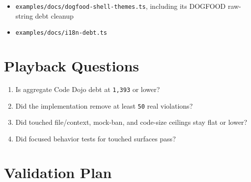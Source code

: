 \begin{itemize}
\item
  \texttt{e\allowbreak{}x\allowbreak{}a\allowbreak{}m\allowbreak{}p\allowbreak{}l\allowbreak{}e\allowbreak{}s\allowbreak{}/\allowbreak{}d\allowbreak{}o\allowbreak{}c\allowbreak{}s\allowbreak{}/\allowbreak{}d\allowbreak{}o\allowbreak{}g\allowbreak{}f\allowbreak{}o\allowbreak{}o\allowbreak{}d\allowbreak{}-\allowbreak{}s\allowbreak{}h\allowbreak{}e\allowbreak{}l\allowbreak{}l\allowbreak{}-\allowbreak{}t\allowbreak{}h\allowbreak{}e\allowbreak{}m\allowbreak{}e\allowbreak{}s\allowbreak{}.\allowbreak{}t\allowbreak{}s}, including its DOGFOOD raw-string debt cleanup
\item
  \texttt{e\allowbreak{}x\allowbreak{}a\allowbreak{}m\allowbreak{}p\allowbreak{}l\allowbreak{}e\allowbreak{}s\allowbreak{}/\allowbreak{}d\allowbreak{}o\allowbreak{}c\allowbreak{}s\allowbreak{}/\allowbreak{}i\allowbreak{}1\allowbreak{}8\allowbreak{}n\allowbreak{}-\allowbreak{}d\allowbreak{}e\allowbreak{}b\allowbreak{}t\allowbreak{}.\allowbreak{}t\allowbreak{}s}
\end{itemize}

\section{Playback Questions}\label{record-228-playback-questions}

\begin{enumerate}
\def\labelenumi{\arabic{enumi}.}
\tightlist
\item
  Is aggregate Code Dojo debt at \texttt{1\allowbreak{},\allowbreak{}3\allowbreak{}9\allowbreak{}3} or lower?
\item
  Did the implementation remove at least \texttt{5\allowbreak{}0} real violations?
\item
  Did touched file/context, mock-ban, and code-size ceilings stay flat or lower?
\item
  Did focused behavior tests for touched surfaces pass?
\end{enumerate}

\section{Validation Plan}\label{record-228-validation-plan}

